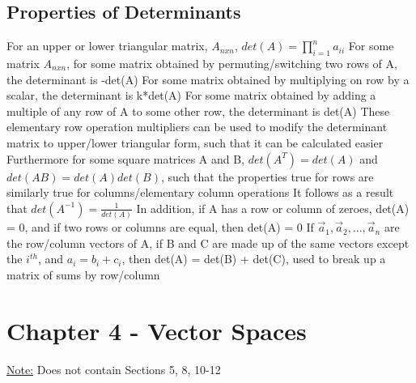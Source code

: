 \documentclass[11 pt, twoside]{article}
\newenvironment{outline*}
{
	\begin{outline}[enumerate]
	}
	{\end{outline}
}
\begin{document}
\subsection{Properties of Determinants}
\begin{outline*}
\1 For an upper or lower triangular matrix, $A_{nxn}$, $det(A) = \prod_{i = 1}^n a_{ii}$
\1 For some matrix $A_{nxn}$, for some matrix obtained by permuting/switching two rows of A, the determinant is -det(A)
\2 For some matrix obtained by multiplying on row by a scalar, the determinant is k*det(A)
\2 For some matrix obtained by adding a multiple of any row of A to some other row, the determinant is det(A)
\1 These elementary row operation multipliers can be used to modify the determinant matrix to upper/lower triangular form, such that it can be calculated easier
\1 Furthermore for some square matrices A and B, $det(A^T) = det(A)$ and $det(AB) = det(A)det(B)$, such that the properties true for rows are similarly true for columns/elementary column operations
\2 It follows as a result that $det(A^{-1}) = \frac{1}{det(A)}$
\2 In addition, if A has a row or column of zeroes, det(A) = 0, and if two rows or columns are equal, then det(A) = 0
\2 If $\vec{a}_1, \vec{a}_2, \dots, \vec{a}_n$ are the row/column vectors of A, if B and C are made up of the same vectors except the $i^{th}$, and $a_i = b_i + c_i$, then det(A) = det(B) + det(C), used to break up a matrix of sums by row/column
\end{outline*}
\section{Chapter 4 - Vector Spaces}
\underline{Note:} Does not contain Sections 5, 8, 10-12
\end{document}

